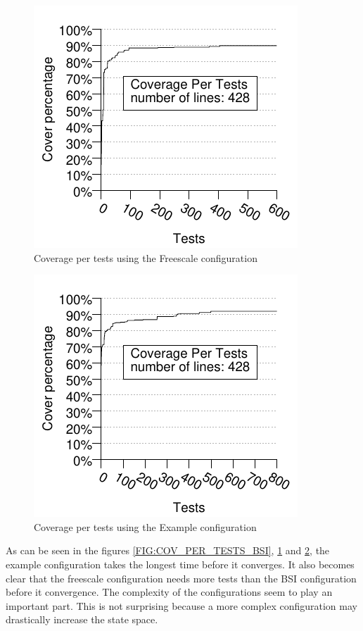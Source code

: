 \begin{figure}[!ht]
\begin{center}
\includegraphics{generated_pictures/coverage_per_tests_freescale.pdf}
\end{center}
\caption{Coverage per tests using the Freescale configuration}
\label{FIG:COV_PER_TESTS_FREESCALE}
\end{figure}


\begin{figure}[!ht]
\begin{center}
\includegraphics{generated_pictures/coverage_per_tests_example.pdf}
\end{center}
\caption{Coverage per tests using the Example configuration}
\label{FIG:COV_PER_TESTS_EXAMPLE}
\end{figure}

As can be seen in the figures \ref{FIG:COV_PER_TESTS_BSI},
\ref{FIG:COV_PER_TESTS_FREESCALE} and \ref{FIG:COV_PER_TESTS_EXAMPLE},
the example configuration takes the longest time before it
converges. It also becomes clear that the freescale configuration
needs more tests than the BSI configuration before it convergence. The
complexity of the configurations seem to play an important
part. This is not surprising because a more complex configuration may
drastically increase the state space.

